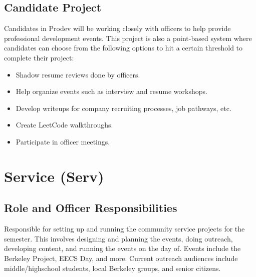 \documentclass[11pt, article, oneside]{memoir}
\begin{document}
    \subsection{Candidate Project}
        Candidates in Prodev will be working closely with officers to help provide professional development events. This project is also a point-based system where candidates can choose from the following options to hit a certain threshold to complete their project:
        \begin{itemize}
            \item Shadow resume reviews done by officers.
            \item Help organize events such as interview and resume workshops.
            \item Develop writeups for company recruiting processes, job pathways, etc.
            \item Create LeetCode walkthroughs.
            \item Participate in officer meetings.
        \end{itemize}

    \bigbreak

    \section{Service (Serv)}
    \subsection{Role and Officer Responsibilities}
        Responsible for setting up and running the community service projects for the semester. This involves designing and planning the events, doing outreach, developing content, and running the events on the day of. Events include the Berkeley Project, EECS Day, and more. Current outreach audiences include middle/highschool students, local Berkeley groups, and senior citizens.
\end{document}
